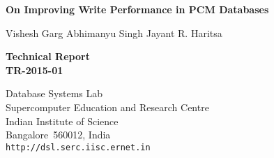   \onecolumn
 \begin{center}
 
 \vspace*{0.75in}
 
 \LARGE{\bf{
 On Improving Write Performance in PCM Databases\\
 }}
 
 \vspace*{0.75in}
 
 \Large{
 Vishesh Garg
 \hspace*{0.3in}
 Abhimanyu Singh
 \hspace*{0.3in}
 Jayant R. Haritsa
 } \\
 
 \vspace*{1.5in}
 
 \Large{\bf Technical Report \\
     TR-2015-01}
 
 \vspace*{0.5in}
 
 \LARGE{
 Database Systems Lab  \\
 Supercomputer Education and Research Centre \\
 Indian Institute of Science \\
 Bangalore~560012, India\\
 \vspace*{0.1in}
 {\tt http://dsl.serc.iisc.ernet.in}
 
 }
 
 \end{center}
 
 \thispagestyle{empty}
 \newpage


